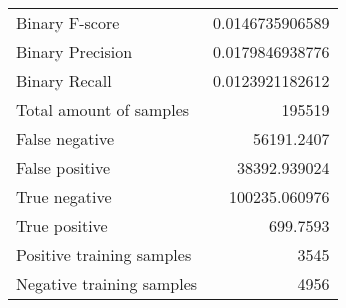 \begin{table}[H]
\begin{minipage}{0.5\textwidth}
\begin{tabular}{l r}
\midrule
Binary F-score & 0.0146735906589 \\
Binary Precision & 0.0179846938776 \\
Binary Recall & 0.0123921182612 \\
\midrule
Total amount of samples & 195519 \\
False negative & 56191.2407 \\
False positive & 38392.939024 \\
True negative & 100235.060976 \\
True positive & 699.7593 \\
\midrule
Positive training samples & 3545 \\
Negative training samples & 4956 \\
\bottomrule
\end{tabular}
\end{minipage}
\end{table}
